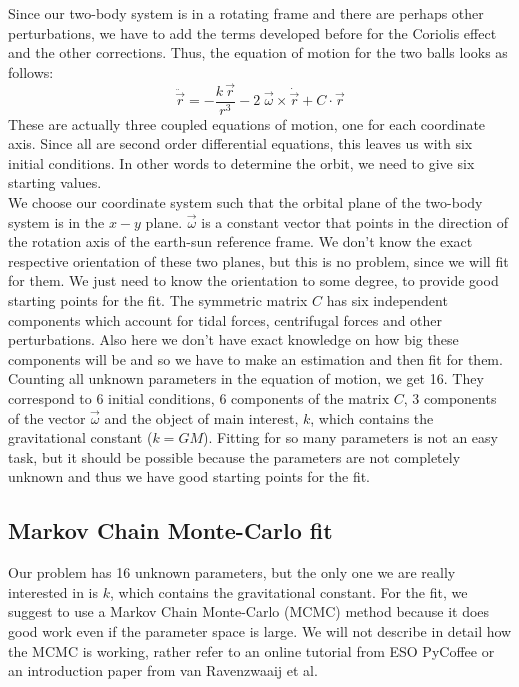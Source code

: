 \documentclass[prb,preprint]{revtex4-1}
\begin{document}
Since our two-body system is in a rotating frame and there are perhaps other perturbations, we have to add the terms developed before for the Coriolis effect and the other corrections. Thus, the equation of motion for the two balls looks as follows:
\begin{equation}
\label{eq:eom}
\ddot{\vec{r}} = - \frac{k\,\vec{r}}{r^3} - 2 \; \vec{\omega} \times \dot{\vec{r}} + C \cdot \vec{r}
\end{equation}
These are actually three coupled equations of motion, one for each coordinate axis. Since all are second order differential equations, this leaves us with six initial conditions. In other words to determine the orbit, we need to give six starting values.\\
We choose our coordinate system such that the orbital plane of the two-body system is in the $x-y$ plane. $\vec{\omega}$ is a constant vector that points in the direction of the rotation axis of the earth-sun reference frame. We don't know the exact respective orientation of these two planes, but this is no problem, since we will fit for them. We just need to know the orientation to some degree, to provide good starting points for the fit.
The symmetric matrix $C$ has six independent components which account for tidal forces, centrifugal forces and other perturbations. Also here we don't have exact knowledge on how big these components will be and so we have to make an estimation and then fit for them. \\

Counting all unknown parameters in the equation of motion, we get 16. They correspond to 6 initial conditions, 6 components of the matrix $C$, 3 components of the vector $\vec{\omega}$ and the object of main interest, $k$,  which contains the gravitational constant ($k = GM$). Fitting for so many parameters is not an easy task, but it should be possible because the parameters are not completely unknown and thus we have good starting points for the fit.\\


\subsection{Markov Chain Monte-Carlo fit}

Our problem has 16 unknown parameters, but the only one we are really interested in is $k$, which contains the gravitational constant. For the fit, we suggest to use a Markov Chain Monte-Carlo (MCMC) method because it does good work even if the parameter space is large. We will not describe in detail how the MCMC is working, rather refer to an online tutorial from ESO PyCoffee\cite{esopycoffee} or an introduction paper from van Ravenzwaaij et al.\cite{vanRavenzwaaij16} \\
\end{document}
